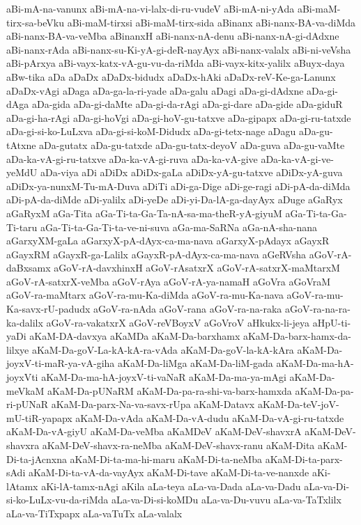 {aBi-mA-na-vanunx
aBi-mA-na-vi-lalx-di-ru-vudeV
aBi-mA-ni-yAda
aBi-maM-tirx-sa-beVku
aBi-maM-tirxsi
aBi-maM-tirx-sida
aBinanx
aBi-nanx-BA-va-diMda
aBi-nanx-BA-va-veMba
aBinanxH
aBi-nanx-nA-denu
aBi-nanx-nA-gi-dAdxne
aBi-nanx-rAda
aBi-nanx-su-Ki-yA-gi-deR-nayAyx
aBi-nanx-valalx
aBi-ni-veVsha
aBi-pArxya
aBi-vayx-katx-vA-gu-vu-da-riMda
aBi-vayx-kitx-yalilx
aBuyx-daya
aBw-tika
aDa
aDaDx
aDaDx-bidudx
aDaDx-hAki
aDaDx-reV-Ke-ga-Lanunx
aDaDx-vAgi
aDaga
aDa-ga-la-ri-yade
aDa-galu
aDagi
aDa-gi-dAdxne
aDa-gi-dAga
aDa-gida
aDa-gi-daMte
aDa-gi-da-rAgi
aDa-gi-dare
aDa-gide
aDa-giduR
aDa-gi-ha-rAgi
aDa-gi-hoVgi
aDa-gi-hoV-gu-tatxve
aDa-gipapx
aDa-gi-ru-tatxde
aDa-gi-si-ko-LuLxva
aDa-gi-si-koM-Didudx
aDa-gi-tetx-nage
aDagu
aDa-gu-tAtxne
aDa-gutatx
aDa-gu-tatxde
aDa-gu-tatx-deyoV
aDa-guva
aDa-gu-vaMte
aDa-ka-vA-gi-ru-tatxve
aDa-ka-vA-gi-ruva
aDa-ka-vA-give
aDa-ka-vA-gi-ve-yeMdU
aDa-viya
aDi
aDiDx
aDiDx-gaLa
aDiDx-yA-gu-tatxve
aDiDx-yA-guva
aDiDx-ya-nunxM-Tu-mA-Duva
aDiTi
aDi-ga-Dige
aDi-ge-ragi
aDi-pA-da-diMda
aDi-pA-da-diMde
aDi-yalilx
aDi-yeDe
aDi-yi-Da-lA-ga-dayAyx
aDuge
aGaRyx
aGaRyxM
aGa-Tita
aGa-Ti-ta-Ga-Ta-nA-sa-ma-theR-yA-giyuM
aGa-Ti-ta-Ga-Ti-taru
aGa-Ti-ta-Ga-Ti-ta-ve-ni-suva
aGa-ma-SaRNa
aGa-nA-sha-nana
aGarxyXM-gaLa
aGarxyX-pA-dAyx-ca-ma-nava
aGarxyX-pAdayx
aGayxR
aGayxRM
aGayxR-ga-Lalilx
aGayxR-pA-dAyx-ca-ma-nava
aGeRVsha
aGoV-rA-daBxsamx
aGoV-rA-davxhinxH
aGoV-rAsatxrX
aGoV-rA-satxrX-maMtarxM
aGoV-rA-satxrX-veMba
aGoV-rAya
aGoV-rA-ya-namaH
aGoVra
aGoVraM
aGoV-ra-maMtarx
aGoV-ra-mu-Ka-diMda
aGoV-ra-mu-Ka-nava
aGoV-ra-mu-Ka-savx-rU-padudx
aGoV-ra-nAda
aGoV-rana
aGoV-ra-na-raka
aGoV-ra-na-ra-ka-dalilx
aGoV-ra-vakatxrX
aGoV-reVBoyxV
aGoVroV
aHkukx-li-jeya
aHpU-ti-yaDi
aKaM-DA-davxya
aKaMDa
aKaM-Da-barxhamx
aKaM-Da-barx-hamx-da-lilxye
aKaM-Da-goV-La-kA-kA-ra-vAda
aKaM-Da-goV-la-kA-kAra
aKaM-Da-joyxV-ti-maR-ya-vA-giha
aKaM-Da-liMga
aKaM-Da-liM-gada
aKaM-Da-ma-hA-joyxVti
aKaM-Da-ma-hA-joyxV-ti-vaNaR
aKaM-Da-ma-ya-mAgi
aKaM-Da-meVkaM
aKaM-Da-pUNaRM
aKaM-Da-pa-ra-shi-va-barx-hamxda
aKaM-Da-pa-ri-pUNaR
aKaM-Da-parx-Na-va-savx-rUpa
aKaM-Datavx
aKaM-Da-teV-joV-mU-tiR-yapapx
aKaM-Da-vAda
aKaM-Da-vA-dudu
aKaM-Da-vA-gi-ru-tatxde
aKaM-Da-vA-giyU
aKaM-Da-veMba
aKaMDeV
aKaM-DeV-shavxrA
aKaM-DeV-shavxra
aKaM-DeV-shavx-ra-neMba
aKaM-DeV-shavx-ranu
aKaM-Dita
aKaM-Di-ta-jAcnxna
aKaM-Di-ta-ma-hi-maru
aKaM-Di-ta-neMba
aKaM-Di-ta-parx-sAdi
aKaM-Di-ta-vA-da-vayAyx
aKaM-Di-tave
aKaM-Di-ta-ve-nanxde
aKi-lAtamx
aKi-lA-tamx-nAgi
aKila
aLa-teya
aLa-va-Dada
aLa-va-Dadu
aLa-va-Di-si-ko-LuLx-vu-da-riMda
aLa-va-Di-si-koMDu
aLa-va-Du-vuvu
aLa-va-TaTxlilx
aLa-va-TiTxpapx
aLa-vaTuTx
aLa-valalx
}
